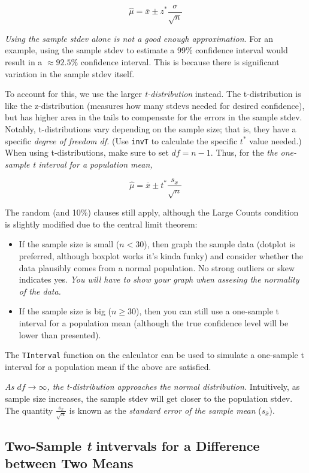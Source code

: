 \documentclass[12pt, a4paper]{article}
\theoremstyle{definition}
\begin{document}
\[\hat{\mu} = \bar{x} \pm z^{*}\frac{\sigma}{\sqrt{n}}\]

\textit{Using the sample stdev alone is not a good enough approximation}.
For an example, using the sample stdev to estimate a 99\% confidence interval would result in a $\approx 92.5\%$ confidence interval.
This is because there is significant variation in the sample stdev itself.

To account for this, we use the larger \textit{t-distribution} instead.
The t-distribution is like the z-distribution (measures how many stdevs needed for desired confidence), but has higher area in the tails to compensate for the errors in the sample stdev.
Notably, t-distributions vary depending on the sample size; that is, they have a specific \textit{degree of freedom df.}
(Use \verb|invT| to calculate the specific $t^{*}$ value needed.)
When using t-distributions, make sure to set $df = n - 1$. Thus, for the \textit{the one-sample t interval for a population mean,}

\[\hat{\mu} = \bar{x} \pm t^{*}\frac{s_x}{\sqrt{n}}\]

The random (and 10\%) clauses still apply, although the Large Counts condition is slightly modified due to the central limit theorem:
\begin{itemize}
    \item If the sample size is small ($n < 30$), then graph the sample data (dotplot is preferred, although boxplot works it's kinda funky) and consider whether the data plausibly comes from a normal population.
    No strong outliers or skew indicates yes. \textit{You will have to show your graph when assesing the normality of the data.}
    \item If the sample size is big ($n \geq 30$), then you can still use a one-sample t interval for a population mean (although the true confidence level will be lower than presented).
\end{itemize}

The \verb|TInterval| function on the calculator can be used to simulate a one-sample t interval for a population mean if the above are satisfied.

\textit{As $df \rightarrow \infty$, the t-distribution approaches the normal distribution.}
Intuitively, as sample size increases, the sample stdev will get closer to the population stdev.
The quantity $\frac{s_x}{\sqrt{n}}$ is known as the \textit{standard error of the sample mean} ($s_{\bar{x}}$).

\subsection{Two-Sample \textit{t} intvervals for a Difference between Two Means}
\end{document}
